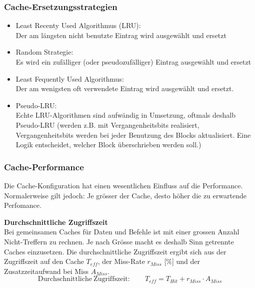 
\subsubsection{Cache-Ersetzungsstrategien}
	\begin{itemize}[noitemsep,topsep=0pt]
		\item Least Recenty Used Algorithmus (LRU):\\
		Der am längsten nicht benutzte Eintrag wird ausgewählt und ersetzt
		\item Random Strategie:\\
		Es wird ein zufälliger (oder pseudozufälliger) Eintrag ausgewählt und ersetzt
		\item Least Fequently Used Algorithmus:\\
		Der am wenigsten oft verwendete Eintrag wird ausgewählt und ersetzt.
		\item Pseudo-LRU:\\
		Echte LRU-Algorithmen sind aufwändig in Umsetzung, oftmals deshalb Pseudo-LRU (werden z.B. mit Vergangenheitsbits realisiert, Vergangenheitsbits werden bei jeder Benutzung des Blocks aktualisiert.
		Eine Logik entscheidet, welcher Block überschrieben werden soll.)
	\end{itemize}
	
	\subsubsection{Cache-Performance}
Die Cache-Konfiguration hat einen wesentlichen Einfluss auf die Performance.
Normalerweise gilt jedoch: Je grösser der Cache, desto höher die zu erwartende Perfomance.

\textbf{Durchschnittliche Zugriffszeit}\\
Bei gemeinsamen Caches für Daten und Befehle ist mit einer grossen Anzahl Nicht-Treffern zu rechnen.
Je nach Grösse macht es deshalb Sinn getrennte Caches einzusetzen. Die durchschnittliche Zugriffszeit ergibt sich aus der Zugriffszeit auf den Cache $T_{eff}$, der Miss-Rate $r_{Miss}$ [\%] und der Zusatzzeitaufwand bei Miss $A_{Miss}$.
\begin{equation*}
	\mathrm{Durchschnittliche \ Zugriffszeit:} \qquad T_{eff} = T_{Hit} + r_{Miss} \cdot A_{Miss}
\end{equation*}

